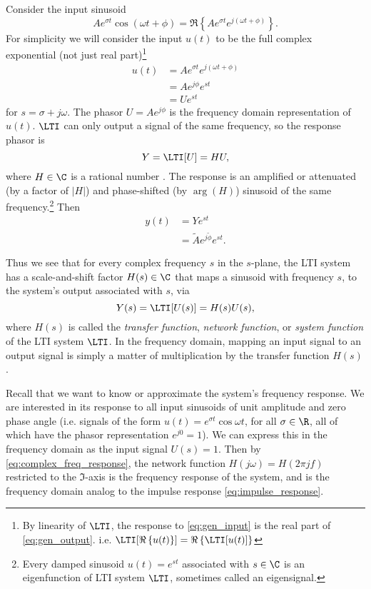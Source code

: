 Consider the input sinusoid 
\begin{equation}
Ae^{\sigma t} \cos (\omega t + \phi) = \Re\left\{ Ae^{\sigma t}e^{j(\omega t + \phi)} \right\}.
\label{eq:gen_input}
\end{equation}
 For simplicity we will consider the input $u(t)$ to be the full complex 
exponential (not just real part)\footnote{By linearity of $\LTI$, the response to \eqref{eq:gen_input} is the real part of \eqref{eq:gen_output}.  i.e. $\LTI[\Re\left\{ u(t) \right\} ]  =\Re\left\{ \LTI[u(t)] \right\}$}
\begin{align*}
u(t)&=Ae^{\sigma t}e^{j(\omega t + \phi)}\\
&= Ae^{j\phi}e^{st}\\
& = U e^{st}
\end{align*}
for $s=\sigma+j\omega$.  The phasor $U = Ae^{j\phi}$ is the frequency domain representation of $u(t)$.  $\LTI$ can only output a signal of the same frequency, so the response phasor is 
\begin{equation}
Y = \LTI[U] = HU,
\label{eq:eigensignal}
\end{equation}
where $H\in\C$ is a rational number . The response is an amplified or attenuated (by a factor of $|H|$) and phase-shifted (by $\arg(H)$) sinusoid of the same frequency.\footnote{Every damped sinusoid $u(t)=e^{st}$ associated with $s\in\C$ is an eigenfunction of LTI system $\LTI$, sometimes called an eigensignal.}  Then
\begin{align}
y(t) &= Ye^{st}\nonumber\\
&= \tilde{A}e^{j\tilde{\phi}}e^{st} \label{eq:gen_output}.
\end{align}

Thus we see that for every complex frequency $s$ in the $s$-plane, the LTI system has 
a scale-and-shift factor $H(s)\in\C$ that maps a sinusoid with frequency $s$, to the system's output associated with $s$, via   
\begin{equation}
	Y(s) = \LTI[U(s)] = H(s) U(s),
	\label{eq:complex_freq_response}
\end{equation}
where $H(s)$ is called the \emph{transfer function}, \emph{network function}, or \emph{system function} of the LTI system $\LTI$.
In the frequency domain, mapping an input signal to an output signal is simply a matter of multiplication by the transfer function $H(s)$. 

  Recall that we want to know or approximate the system's frequency response.  We are interested in its response to all input sinusoids of unit amplitude and zero phase angle (i.e. signals of the form $u(t)=e^{\sigma t} \cos\omega t$, for all $\sigma\in\R$, all of which have the phasor representation $e^{j0}=1$).    We can express this in the frequency domain as the input signal $U(s)=1$.  Then by \eqref{eq:complex_freq_response}, the network function $H(j\omega)=H(2\pi j f)$ restricted to the $\Im$-axis is the frequency response of the system, and is the frequency domain analog to the impulse response \eqref{eq:impulse_response}.    


